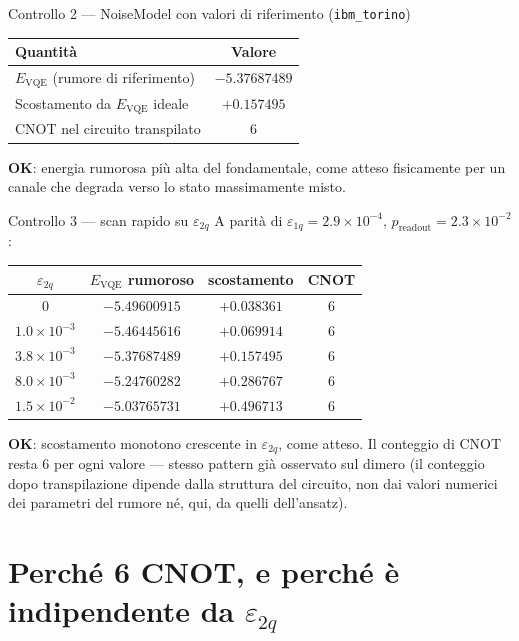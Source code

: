 \documentclass[11pt,a4paper]{article}
\begin{document}
\begin{okbox}{Controllo 2 --- NoiseModel con valori di riferimento (\texttt{ibm\_torino})}
\begin{center}
\renewcommand{\arraystretch}{1.25}
\begin{tabular}{@{}lc@{}}
\toprule
\textbf{Quantità} & \textbf{Valore}\\
\midrule
$E_\text{VQE}$ (rumore di riferimento) & $-5.37687489$\\
Scostamento da $E_\text{VQE}$ ideale & $+0.157495$\\
CNOT nel circuito transpilato & $6$\\
\bottomrule
\end{tabular}
\end{center}
\textbf{OK}: energia rumorosa più alta del fondamentale, come atteso
fisicamente per un canale che degrada verso lo stato massimamente misto.
\end{okbox}

\begin{okbox}{Controllo 3 --- scan rapido su $\varepsilon_{2q}$}
A parità di $\varepsilon_{1q}=2.9\times10^{-4}$,
$p_\text{readout}=2.3\times10^{-2}$:
\begin{center}
\renewcommand{\arraystretch}{1.25}
\begin{tabular}{@{}cccc@{}}
\toprule
$\varepsilon_{2q}$ & $E_\text{VQE}$ rumoroso & scostamento & CNOT\\
\midrule
$0$ & $-5.49600915$ & $+0.038361$ & $6$\\
$1.0\times10^{-3}$ & $-5.46445616$ & $+0.069914$ & $6$\\
$3.8\times10^{-3}$ & $-5.37687489$ & $+0.157495$ & $6$\\
$8.0\times10^{-3}$ & $-5.24760282$ & $+0.286767$ & $6$\\
$1.5\times10^{-2}$ & $-5.03765731$ & $+0.496713$ & $6$\\
\bottomrule
\end{tabular}
\end{center}
\textbf{OK}: scostamento monotono crescente in $\varepsilon_{2q}$, come
atteso. Il conteggio di CNOT resta $6$ per ogni valore --- stesso
pattern già osservato sul dimero (il conteggio dopo transpilazione
dipende dalla struttura del circuito, non dai valori numerici dei
parametri del rumore né, qui, da quelli dell'ansatz).
\end{okbox}

\section{Perché 6 CNOT, e perché è indipendente da $\varepsilon_{2q}$}
\end{document}
